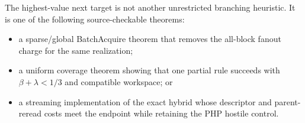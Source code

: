 \documentclass[11pt]{article}
\begin{document}
The highest-value next target is not another unrestricted branching
heuristic.  It is one of the following source-checkable theorems:
\begin{itemize}
\item[] a sparse/global BatchAcquire theorem that removes the all-block
fanout charge for the same realization;
\item[] a uniform coverage theorem showing that one partial rule succeeds
with $\beta+\lambda<1/3$ and compatible workspace; or
\item[] a streaming implementation of the exact hybrid whose descriptor and
parent-reread costs meet the endpoint while retaining the PHP hostile control.
\end{itemize}




\end{document}
